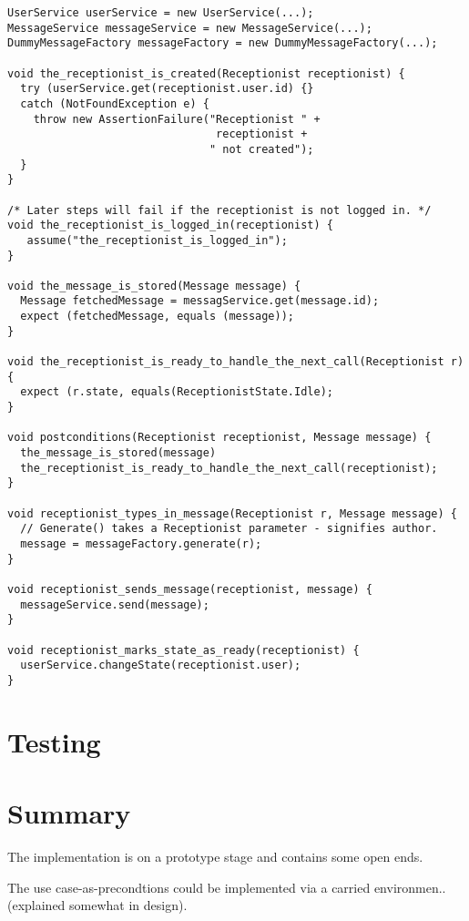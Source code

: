 \begin{lstlisting}[style=Dart, caption=Example template methods (written manually),label={lst:example-template-methods}]
UserService userService = new UserService(...);
MessageService messageService = new MessageService(...);
DummyMessageFactory messageFactory = new DummyMessageFactory(...);
  
void the_receptionist_is_created(Receptionist receptionist) {
  try (userService.get(receptionist.user.id) {}
  catch (NotFoundException e) {
    throw new AssertionFailure("Receptionist " + 
                                receptionist + 
                               " not created");
  }
}

/* Later steps will fail if the receptionist is not logged in. */
void the_receptionist_is_logged_in(receptionist) {
   assume("the_receptionist_is_logged_in");
}

void the_message_is_stored(Message message) {
  Message fetchedMessage = messagService.get(message.id);
  expect (fetchedMessage, equals (message));
}

void the_receptionist_is_ready_to_handle_the_next_call(Receptionist r) {
  expect (r.state, equals(ReceptionistState.Idle);
}

void postconditions(Receptionist receptionist, Message message) {
  the_message_is_stored(message)
  the_receptionist_is_ready_to_handle_the_next_call(receptionist);
}

void receptionist_types_in_message(Receptionist r, Message message) {
  // Generate() takes a Receptionist parameter - signifies author.
  message = messageFactory.generate(r);
}

void receptionist_sends_message(receptionist, message) {
  messageService.send(message);
}

void receptionist_marks_state_as_ready(receptionist) {
  userService.changeState(receptionist.user);
} 

\end{lstlisting}

\section{Testing}

\section{Summary}
The implementation is on a prototype stage and contains some open ends.

The use case-as-precondtions could be implemented via a carried environmen.. (explained somewhat in design).
